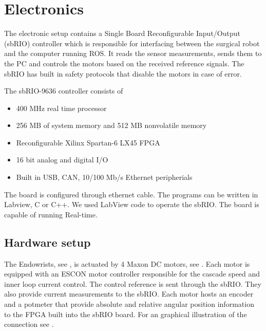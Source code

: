 \section{Electronics}\label{sec:electronics}

The electronic setup contains a Single Board Reconfigurable Input/Output (sbRIO) controller which is responsible for interfacing between the surgical robot and the computer running ROS. It reads the sensor measurements, sends them to the PC and controls the motors based on the received reference signals. The sbRIO has built in safety protocols that disable the motors in case of error.

The sbRIO-9636 controller consists of
\begin{itemize}
	\item 400 MHz real time processor
	\item 256 MB of system memory and 512 MB nonvolatile memory
	\item Reconfigurable Xilinx Spartan-6 LX45 FPGA
	\item 16 bit analog and digital I/O
	\item Built in USB, CAN, 10/100 Mb/s Ethernet peripherials
\end{itemize}

The board is configured through ethernet cable. The programs can be written in Labview, C or C++. We used LabView code to operate the sbRIO. The board is capable of running Real-time. %


\subsection{Hardware setup}

The Endowrists, see , is actuated by 4 Maxon DC motors, see . Each motor is equipped with an ESCON motor controller responsible for the cascade speed and inner loop current control. The control reference is sent through the sbRIO. They also provide current measurements to the sbRIO. Each motor hosts an encoder and a potmeter that provide absolute and relative angular position information to the FPGA built into the sbRIO board. For an graphical illustration of the connection see .
 
